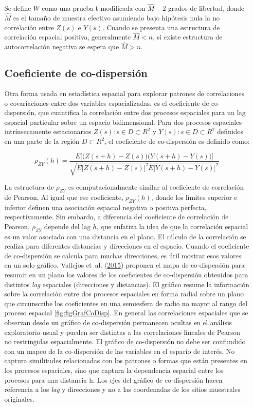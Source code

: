 \documentclass[11pt,b5paper,]{krantz}
\begin{document}
Se define \(W\) como una prueba t modificada con \(\hat{M}-2\) grados de
libertad, donde \(\hat{M}\) es el tamaño de muestra efectivo asumiendo
bajo hipótesis nula la no correlación entre \(Z(s)\) e \(Y(s)\). Cuando
se presenta una estructura de correlación espacial positiva,
generalmente \(\hat{M} < n\), si existe estructura de autocorrelación
negativa se espera que \(\hat{M} > n\).

\subsection{Coeficiente de
co-dispersión}\label{coeficiente-de-co-dispersiuxf3n}

Otra forma usada en estadística espacial para explorar patrones de
correlaciones o covariaciones entre dos variables espacializadas, es el
coeficiente de co-dispersión, que cuantifica la correlación entre dos
procesos espaciales para un lag espacial particular sobre un espacio
bidimensional. Para dos procesos espaciales intrínsecamente
estacionarios \({Z(s):s\in D\subset R^2}\) y
\({Y(s):s\in D\subset R^2}\) definidos en una parte de la región
\(D\subset R^2\), el coeficiente de co-dispersión es definido como:

\[\rho_{ZY}(h)= \frac{E \Big[ \big(Z(s+h)-Z(s) \big) \big(Y(s+h)-Y(s) \big) \Big]}{\sqrt{E \big[Z(s+h)-Z(s) \big]^2 E \big[Y(s+h)-Y(s) \big]^2}}\]

La estructura de \(\rho_{ZY}\) es computacionalmente similar al
coeficiente de correlación de Pearson. Al igual que ese coeficiente,
\(\rho_{ZY}(h)\), donde los límites superior e inferior definen una
asociación espacial negativa o positiva perfecta, respectivamente. Sin
embardo, a diferencia del coeficiente de correlación de Pearson,
\(\rho_{ZY}\) depende del lag \(h\), que enfatiza la idea de que la
correlación espacial es un valor asociado con una distancia en el plano.
El cálculo de la correlación se realiza para diferentes distancias y
direcciones en el espacio. Cuando el coeficiente de co-dispersión se
calcula para muchas direcciones, es útil mostrar esos valores en un solo
gráfico. Vallejos et~al. (\protect\hyperlink{ref-Vallejos2015}{2015})
proponen el mapa de co-dispersión para resumir en un plano los valores
de los coeficientes de co-dispersión obtenidos para distintos \emph{lag}
espaciales (direcciones y distancias). El gráfico resume la información
sobre la correlación entre dos procesos espaciales en forma radial sobre
un plano que circunscribe los coeficientes en una semiesfera de radio no
mayor al rango del proceso espacial \ref{fig:figGrafCoDisp}. En general
las correlaciones espaciales que se observan desde un gráfico de
co-dispersión permanecen ocultas en el análisis exploratorio usual y
pueden ser distintas a las correlaciones lineales de Pearson no
restringidas espacialmente. El gráfico de co-dispersión no debe ser
confundido con un mapeo de la co-dispersión de las variables en el
espacio de interés. No captura similitudes relacionadas con los patrones
o formas que están presentes en los procesos espaciales, sino que
captura la dependencia espacial entre los procesos para una distancia h.
Los ejes del gráfico de co-dispersión hacen referencia a los \emph{lag}
y direcciones y no a las coordenadas de los sitios muestrales
originales.
\end{document}
